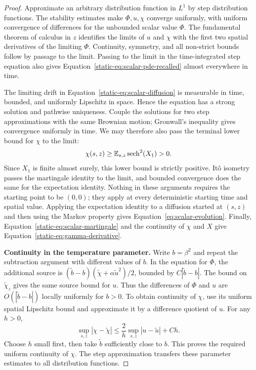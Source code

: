\begin{proof}
Approximate an arbitrary distribution function in $L^1$ by step
distribution functions. The stability estimates make $\Phi,u,\chi$
converge uniformly, with uniform convergence of differences for the
unbounded scalar value $\Phi$. The fundamental theorem of calculus
in $z$ identifies the limits of $u$ and $\chi$ with the first two
spatial derivatives of the limiting $\Phi$. Continuity, symmetry,
and all non-strict bounds follow by passage to the limit.
Passing to the limit in the time-integrated step equation also gives
Equation~\eqref{static-eq:scalar-pde-recalled} almost everywhere in time.

The limiting drift in Equation~\eqref{static-eq:scalar-diffusion} is
measurable in time, bounded, and uniformly Lipschitz in space. Hence
the equation has a strong solution and pathwise uniqueness. Couple
the solutions for two step approximations with the same Brownian
motion; Gronwall's inequality gives convergence uniformly in time.
We may therefore also pass the terminal lower bound for $\chi$ to
the limit:
\[
 \chi(s,z)\ge\mathbb E_{s,z}\operatorname{sech}^2(X_1)>0.
\]
Since $X_1$ is finite almost surely, this lower bound is strictly
positive. It\^o isometry passes the martingale identity to the limit,
and bounded convergence does the same for the expectation identity.
Nothing in these arguments requires the starting point to be
$(0,0)$; they apply at every deterministic starting time and spatial
value. Applying the expectation identity to a diffusion started at
$(s,z)$ and then using the Markov property gives
Equation~\eqref{eq:scalar-evolution}. Finally,
Equation~\eqref{static-eq:scalar-martingale} and the
continuity of $\chi$ and $X$ give
Equation~\eqref{static-eq:gamma-derivative}.

\par\medskip\noindent\textbf{Continuity in the temperature parameter.}\enspace
Write $b=\beta^2$ and repeat the subtraction argument with different
values of $b$. In the equation for $\Phi$, the additional source is
$(\widetilde b-b)(\widetilde\chi+
\alpha\widetilde u^2)/2$, bounded by $C|\widetilde b-b|$.
The bound on $\widetilde\chi_z$ gives the same source bound for
$u$. Thus the differences of $\Phi$ and $u$ are
$O(|\widetilde b-b|)$ locally uniformly for $b>0$.
To obtain continuity of $\chi$, use its uniform spatial Lipschitz
bound and approximate it by a difference quotient of $u$. For
any $h>0$,
\[
 \sup_{s,z}|\chi-\widetilde\chi|
 \le\frac{2}{h}\sup_{s,z}|u-\widetilde u|+C h.
\]
Choose $h$ small first, then take $\widetilde b$ sufficiently close to
$b$. This proves the required uniform continuity of $\chi$.
The step approximation transfers these parameter estimates to
all distribution functions.
\end{proof}

